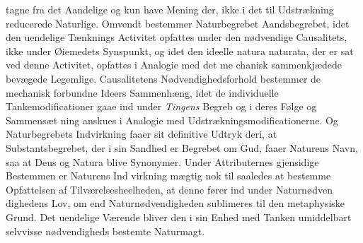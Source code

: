 \documentclass[12pt,a4paper]{book}
\begin{document}
tagne fra det Aandelige og kun have Mening der, ikke i det
til Udstrækning reducerede Naturlige. Omvendt bestemmer
Naturbegrebet Aandsbegrebet, idet den uendelige Tænknings
Activitet opfattes under den nødvendige Causalitets, ikke under
Øiemedets Synspunkt, og idet den ideelle natura naturata, der
er sat ved denne Activitet, opfattes i Analogie med det me\-%
chanisk sammenkjædede bevægede Legemlige. Causalitetens
Nødvendighedsforhold bestemmer de mechanisk forbundne Ideers
Sammenhæng, idet de individuelle Tankemodificationer gaae
ind under \emph{Tingens} Begreb og i deres Følge og Sammensæt\-%
ning anskues i Analogie med Udstrækningsmodificationerne.
Og Naturbegrebets Indvirkning faaer sit definitive Udtryk deri,
at Substantsbegrebet, der i sin Sandhed er Begrebet om Gud,
faaer Naturens Navn, saa at Deus og Natura blive Synonymer.
Under Attributernes gjensidige Bestemmen er Naturens Ind\-%
virkning mægtig nok til saaledes at bestemme Opfattelsen af
Tilværelsesheelheden, at denne fører ind under Naturnødven\-%
dighedens Lov, om end Naturnødvendigheden sublimeres til
den metaphysiske Grund. Det uendelige Værende bliver den
i sin Enhed med Tanken umiddelbart selvvisse nødvendigheds\-%
bestemte Naturmagt.
\end{document}
